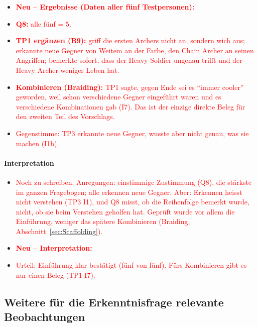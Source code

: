 \documentclass[../Main.tex]{subfiles}
\begin{document}
\begin{itemize}[leftmargin=1.5cm]
    \item \textcolor{red}{\textbf{Neu -- Ergebnisse (Daten aller fünf Testpersonen):}}
    \item \textcolor{red}{\textbf{Q8:} alle fünf = 5.}
    \item \textcolor{red}{\textbf{TP1 ergänzen (B9):} griff die ersten Archers nicht an, sondern wich aus; erkannte neue Gegner von Weitem an der Farbe, den Chain Archer an seinen Angriffen; bemerkte sofort, dass der Heavy Soldier ungenau trifft und der Heavy Archer weniger Leben hat.}
    \item \textcolor{red}{\textbf{Kombinieren (Braiding):} TP1 sagte, gegen Ende sei es \enquote{immer cooler} geworden, weil schon verschiedene Gegner eingeführt waren und es verschiedene Kombinationen gab (I7). Das ist der einzige direkte Beleg für den zweiten Teil des Vorschlags.}
    \item \textcolor{red}{Gegenstimme: TP3 erkannte neue Gegner, wusste aber nicht genau, was sie machen (I1b).}
\end{itemize}

\paragraph{Interpretation}
\begin{itemize}[leftmargin=1.5cm]
    \item \textcolor{red}{Noch zu schreiben. Anregungen: einstimmige Zustimmung (Q8), die stärkste im ganzen Fragebogen; alle erkennen neue Gegner. Aber: Erkennen heisst nicht verstehen (TP3 I1), und Q8 misst, ob die Reihenfolge bemerkt wurde, nicht, ob sie beim Verstehen geholfen hat. Geprüft wurde vor allem die Einführung, weniger das spätere Kombinieren (Braiding, Abschnitt~\ref{sec:Scaffolding}).}
\end{itemize}

\begin{itemize}[leftmargin=1.5cm]
    \item \textcolor{red}{\textbf{Neu -- Interpretation:}}
    \item \textcolor{red}{Urteil: Einführung klar bestätigt (fünf von fünf). Fürs Kombinieren gibt es nur einen Beleg (TP1 I7).}
\end{itemize}

\subsection{Weitere für die Erkenntnisfrage relevante Beobachtungen} \label{sec:WeitereBeobachtungen}
\end{document}
